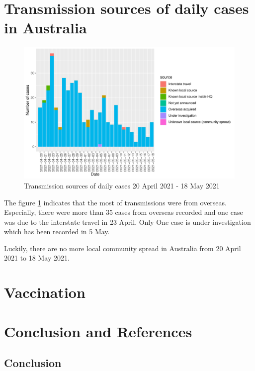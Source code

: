 \documentclass[11pt,a4paper,]{article}
\begin{document}
\section*{Transmission sources of daily cases in Australia}

\begin{figure}

{\centering \includegraphics{report_files/figure-latex/tra-1} 

}

\caption{Transmission sources of daily cases 20 April 2021 - 18 May 2021}\label{fig:tra}
\end{figure}

The figure \ref{fig:tra} indicates that the most of transmissions were from overseas. Especially, there were more than 35 cases from overseas recorded and one case was due to the interstate travel in 23 April. Only One case is under investigation which has been recorded in 5 May.

Luckily, there are no more local community spread in Australia from 20 April 2021 to 18 May 2021.

\section*{Vaccination}

\hypertarget{conclusion-and-references}{%
\section{Conclusion and References}\label{conclusion-and-references}}

\hypertarget{conclusion}{%
\subsection{Conclusion}\label{conclusion}}
\end{document}
